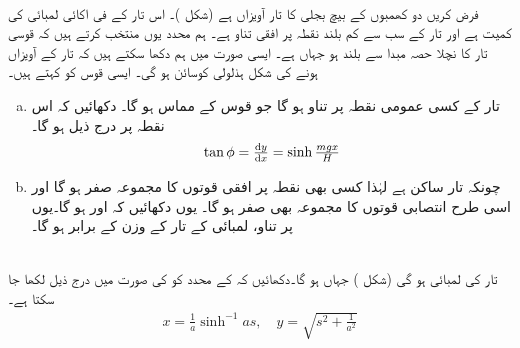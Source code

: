 \\
فرض کریں دو کھمبوں کے بیچ بجلی کا تار  آویزاں ہے (شکل )۔ اس تار کے فی اکائی لمبائی  کی کمیت  ہے اور تار کے سب سے کم بلند  نقطہ پر افقی تناو  ہے۔ ہم محدد یوں منتخب کرتے ہیں کہ قوسی تار کا نچلا حصہ مبدا سے  بلند ہو جہاں  ہے۔ ایسی صورت میں ہم دکھا سکتے ہیں کہ تار کے   آویزاں ہونے کی شکل  ہذلولی کوسائن  ہو گی۔ ایسی قوس کو  کہتے ہیں۔
\begin{enumerate}[a.]
\item
تار کے کسی  عمومی نقطہ  پر تناو  ہو گا جو قوس کے مماس ہو گا۔ دکھائیں کہ اس نقطہ پر درج ذیل ہو گا۔
\begin{align*}
\tan\phi=\tfrac{\dif y}{\dif x}=\sinh \tfrac{mgx}{H}
\end{align*}
\item
چونکہ تار ساکن ہے لہٰذا کسی بھی نقطہ پر افقی قوتوں کا مجموعہ صفر ہو گا اور اسی طرح انتصابی قوتوں کا مجموعہ بھی صفر ہو گا۔ یوں دکھائیں کہ  اور  ہو گا۔یوں  پر تناو،  لمبائی کے تار کے وزن  کے برابر ہو گا۔ 
\end{enumerate}
\\
تار کی لمبائی  ہو گی  (شکل ) جہاں  ہو گا۔دکھائیں کہ  کے محدد کو  کی صورت میں  درج ذیل لکھا جا سکتا ہے۔
\begin{align*}
x=\frac{1}{a}\sinh^{-1}as,\quad y=\sqrt{s^2+\frac{1}{a^2}}
\end{align*}
